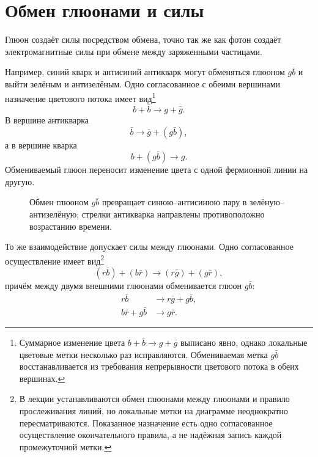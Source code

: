 \section{Обмен глюонами и силы}

Глюон создаёт силы посредством обмена, точно так же как фотон создаёт электромагнитные силы при обмене между заряженными частицами.

Например, синий кварк и антисиний антикварк могут обменяться глюоном \(g\bar b\) и выйти зелёным и антизелёным. Одно согласованное с обеими вершинами назначение цветового потока имеет вид\footnote{Суммарное изменение цвета \(b+\bar b\longrightarrow g+\bar g\) выписано явно, однако локальные цветовые метки несколько раз исправляются. Обмениваемая метка \(g\bar b\) восстанавливается из требования непрерывности цветового потока в обеих вершинах.}
\begin{equation}
b+\bar b
\longrightarrow
g+\bar g.
\end{equation}
В вершине антикварка
\begin{equation}
\bar b\longrightarrow\bar g+(g\bar b),
\end{equation}
а в вершине кварка
\begin{equation}
b+(g\bar b)\longrightarrow g.
\end{equation}
Обмениваемый глюон переносит изменение цвета с одной фермионной линии на другую.

\begin{figure}[h]
\centering
{}
\caption{Обмен глюоном \(g\bar b\) превращает синюю--антисинюю пару в зелёную--антизелёную; стрелки антикварка направлены противоположно возрастанию времени.}
\end{figure}

То же взаимодействие допускает силы между глюонами. Одно согласованное осуществление имеет вид\footnote{В лекции устанавливаются обмен глюонами между глюонами и правило прослеживания линий, но локальные метки на диаграмме неоднократно пересматриваются. Показанное назначение есть одно согласованное осуществление окончательного правила, а не надёжная запись каждой промежуточной метки.}
\begin{equation}
(r\bar b)+(b\bar r)
\longrightarrow
(r\bar g)+(g\bar r),
\end{equation}
причём между двумя внешними глюонами обменивается глюон \(g\bar b\):
\begin{align}
r\bar b&\longrightarrow r\bar g+g\bar b,\\
b\bar r+g\bar b&\longrightarrow g\bar r.
\end{align}

